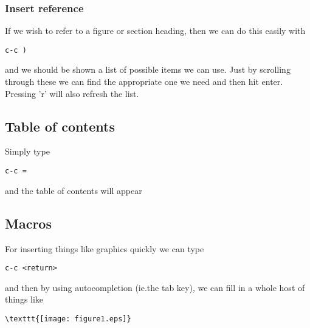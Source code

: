 \documentclass[a4paper, 10pt]{article}
\begin{document}
\subsubsection{Insert reference}
\label{sec:insert-reference}

If we wish to refer to a figure or section heading, then we can do
this easily with 
\begin{verbatim}
c-c )
\end{verbatim}
and we should be shown a list of possible items we can use. Just by
scrolling through these we can find the appropriate one we need and
then hit enter. Pressing 'r' will also refresh the list.


\subsection*{Table of contents}

Simply type
\begin{verbatim}
c-c =
\end{verbatim}
and the table of contents will appear
 
\subsection*{Macros}

For inserting things like graphics quickly we can type
\begin{verbatim}
c-c <return>
\end{verbatim}
and then by using autocompletion (ie.the tab key), we can fill in a whole host of things like 
\begin{verbatim}
\texttt{[image: figure1.eps]}
\end{verbatim}
\end{document}
